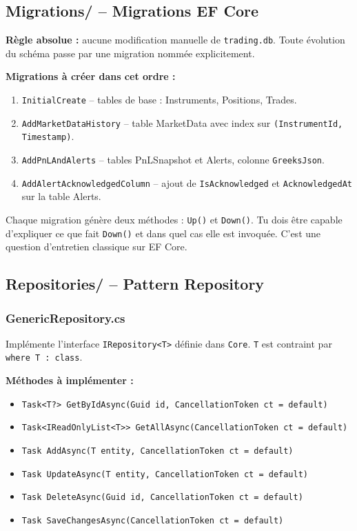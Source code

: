 \documentclass[a4paper,11pt]{article}
\newcommand{\cs}[1]{\texttt{\color{codeinline}#1}}
\begin{document}
\subsection{Migrations/ -- Migrations EF Core}

\textbf{Règle absolue :} aucune modification manuelle de \texttt{trading.db}.
Toute évolution du schéma passe par une migration nommée explicitement.

\textbf{Migrations à créer dans cet ordre :}
\begin{enumerate}
  \item \texttt{InitialCreate} -- tables de base : Instruments, Positions, Trades.
  \item \texttt{AddMarketDataHistory} -- table MarketData avec index sur
        \cs{(InstrumentId, Timestamp)}.
  \item \texttt{AddPnLAndAlerts} -- tables PnLSnapshot et Alerts, colonne
        \cs{GreeksJson}.
  \item \texttt{AddAlertAcknowledgedColumn} -- ajout de \cs{IsAcknowledged} et
        \cs{AcknowledgedAt} sur la table Alerts.
\end{enumerate}

\begin{tcolorbox}[note]
Chaque migration génère deux méthodes : \cs{Up()} et \cs{Down()}. Tu dois être
capable d'expliquer ce que fait \cs{Down()} et dans quel cas elle est invoquée.
C'est une question d'entretien classique sur EF Core.
\end{tcolorbox}

\subsection{Repositories/ -- Pattern Repository}

\subsubsection{GenericRepository.cs}

Implémente l'interface \cs{IRepository<T>} définie dans \texttt{Core}.
\cs{T} est contraint par \cs{where T : class}.

\textbf{Méthodes à implémenter :}
\begin{itemize}
  \item \cs{Task<T?> GetByIdAsync(Guid id, CancellationToken ct = default)}
  \item \cs{Task<IReadOnlyList<T>> GetAllAsync(CancellationToken ct = default)}
  \item \cs{Task AddAsync(T entity, CancellationToken ct = default)}
  \item \cs{Task UpdateAsync(T entity, CancellationToken ct = default)}
  \item \cs{Task DeleteAsync(Guid id, CancellationToken ct = default)}
  \item \cs{Task SaveChangesAsync(CancellationToken ct = default)}
\end{itemize}
\end{document}
